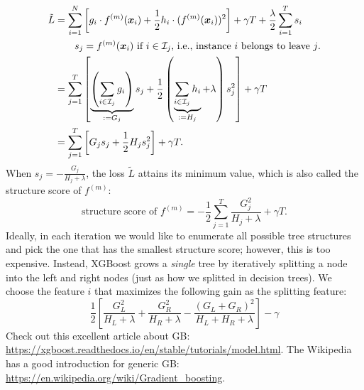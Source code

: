            \begin{equation}
                \begin{aligned}
                    \tilde{L} & = \sum_{i=1}^{N}{
                        \left[
                            g_i \cdot f^{(m)}(\bm{x}_i) + \frac{1}{2} h_i \cdot (f^{(m)}(\bm{x}_i))^2 
                        \right] + \gamma T + \frac{\lambda}{2}\sum_{i=1}^{T}{s_i}
                    } \\
                    & \quad \quad \text{$s_j = f^{(m)}(\bm{x}_i)$ if $i \in \mathcal{I}_j$, i.e., instance $i$ belongs to leave $j$.} \\
                    & = \sum_{j=1}^{T}{
                        \left[ \underbrace{\left(\sum_{i \in \mathcal{I}_j}^{}{g_i} \right)}_{:=G_j} s_j + \frac{1}{2}\left( \underbrace{\sum_{i \in \mathcal{I}_j}^{}{h_i}}_{:=H_j} + \lambda \right)s_j^2
                        \right] + \gamma T 
                    } \\
                    & = \sum_{j=1}^{T}{ \left[ G_j s_j + \frac{1}{2} H_j s_j^2 \right] } + \gamma T.
                \end{aligned}
            \end{equation}
        When $s_j = -\frac{G_j}{H_j + \lambda}$, the loss $\tilde{L}$ attains its minimum value, which is also called the structure score of $f^{(m)}$:
            \begin{equation}
                \text{structure score of $f^{(m)}$}= -\frac{1}{2}\sum_{j=1}^{T}{\frac{G_j^2}{H_j + \lambda}} + \gamma T.
            \end{equation}
        Ideally, in each iteration we would like to enumerate all possible tree structures and pick the one that has the smallest structure score; however, this is too expensive.
        Instead, XGBoost grows a \emph{single} tree by iteratively splitting a node into the left and right nodes (just as how we splitted in decision trees).
        We choose the feature $i$ that maximizes the following gain as the splitting feature:
            \begin{equation}
                \frac{1}{2}\left[ \frac{G_L^2}{H_L + \lambda} + \frac{G_R^2}{H_R + \lambda} - \frac{(G_L + G_R)^2}{H_L +  H_R + \lambda}  \right] - \gamma
            \end{equation}
        Check out this excellent article about GB: \url{https://xgboost.readthedocs.io/en/stable/tutorials/model.html}.
        The Wikipedia has a good introduction for generic GB: \url{https://en.wikipedia.org/wiki/Gradient_boosting}.
    
